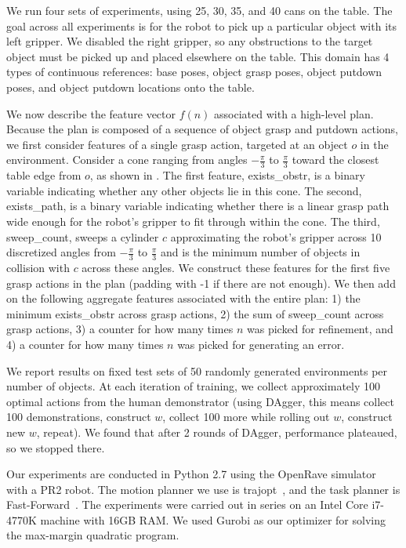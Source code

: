 We run four sets of experiments, using 25, 30, 35, and 40 cans on the table.
The goal across all experiments is for the robot to pick up a particular object with its
left gripper. We disabled the right gripper, so any obstructions to the target object must be picked up and
placed elsewhere on the table. This domain has 4 types of continuous references: base poses, object grasp
poses, object putdown poses, and object putdown locations onto the table.

We now describe the feature vector $f(n)$ associated with a high-level plan. Because the plan is composed
of a sequence of object grasp and putdown actions, we first consider features of a single grasp action, targeted
at an object $o$ in the environment. Consider a cone ranging from angles $-\frac{\pi}{3}$ to $\frac{\pi}{3}$
toward the closest table edge from $o$, as shown in . The first feature, exists\_obstr, is a binary variable indicating
whether any other objects lie in this cone. The second, exists\_path, is a binary variable indicating whether there is a linear
grasp path wide enough for the robot's gripper to fit through within the cone. The third, sweep\_count, sweeps
a cylinder $c$ approximating the robot's gripper across 10 discretized angles from $-\frac{\pi}{3}$ to
$\frac{\pi}{3}$ and is the minimum number of objects in collision with $c$ across these angles.
We construct these features for the first five grasp actions in the plan (padding with -1 if there are not enough).
We then add on the following aggregate features associated with the entire plan: 1) the minimum exists\_obstr across grasp actions,
2) the sum of sweep\_count across grasp actions, 3) a counter for how many times $n$ was picked for refinement, and
4) a counter for how many times $n$ was picked for generating an error.

We report results on fixed test sets of 50 randomly generated environments per number of objects. At each
iteration of training, we collect approximately 100 optimal actions from the human demonstrator (using
DAgger, this means collect 100 demonstrations, construct $w$, collect 100 more while rolling out $w$, construct new $w$, repeat).
We found that after 2 rounds of DAgger, performance plateaued, so we stopped there.

Our experiments are conducted in Python 2.7 using the OpenRave simulator~\cite{Diankov_2008_6117} with a PR2 robot.
The motion planner we use is trajopt~\cite{schulman2013finding}, and the task planner is Fast-Forward~\cite{FF}.
The experiments were carried out in series on an Intel Core i7-4770K machine with 16GB RAM. We used Gurobi
as our optimizer for solving the max-margin quadratic program.

